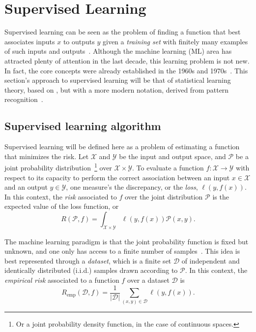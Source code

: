 \section{Supervised Learning}

Supervised learning can be seen as the problem of finding a function that best associates inputs $x$ to outputs $y$ given a \emph{training set} with finitely many examples of such inputs and outputs~\cite{Goodfellow-et-al-2016}.
Although the machine learning (ML) area has attracted plenty of attention in the last decade, this learning problem is not new.
In fact, the core concepts were already established in the 1960s and 1970s~\cite{vapnikNatureStatisticalLearning2000}.
This section's approach to supervised learning will be that of statistical learning theory, based on , but with a more modern notation, derived from pattern recognition~\cite{bishopPatternRecognitionMachine2006,hastieElementsStatisticalLearning2009}.

\subsection{Supervised learning algorithm}

Supervised learning will be defined here as a problem of estimating a function that minimizes the risk.
Let $\mathcal{X}$ and $\mathcal{Y}$ be the input and output space, and $\mathcal{P}$ be a joint probability distribution~\footnote{Or a joint probability density function, in the case of continuous spaces.} over $\mathcal{X}\times \mathcal{Y}$.
To evaluate a function $f: \mathcal{X} \longrightarrow \mathcal{Y}$ with respect to its capacity to perform the correct association between an input $x\in \mathcal{X}$ and an output $y\in \mathcal{Y}$, one measure's the discrepancy, or the \emph{loss}, $\ell(y,f(x))$.
In this context, the \emph{risk} associated to $f$ over the joint distribution $\mathcal{P}$ is the expected value of the loss function, or \[
    R(\mathcal{P},f) = \int_{\mathcal{X}\times \mathcal{Y}} \ell(y,f(x))\mathcal{P}(x,y)
.\] 


The machine learning paradigm is that the joint probability function is fixed but unknown, and one only has access to a finite number of samples~\cite{vapnikNatureStatisticalLearning2000}.
This idea is best represented through a \emph{dataset}, which is a finite set $\mathcal{D}$ of independent and identically distributed (i.i.d.) samples drawn according to $\mathcal{P}$.
In this context, the \emph{empirical risk} associated to a function $f$ over a dataset $\mathcal{D}$ is \[
    R_\textrm{emp}(\mathcal{D},f) = \frac{1}{|\mathcal{D}|} \sum_{(x,y)\in \mathcal{D}} \ell(y, f(x))
.\]

